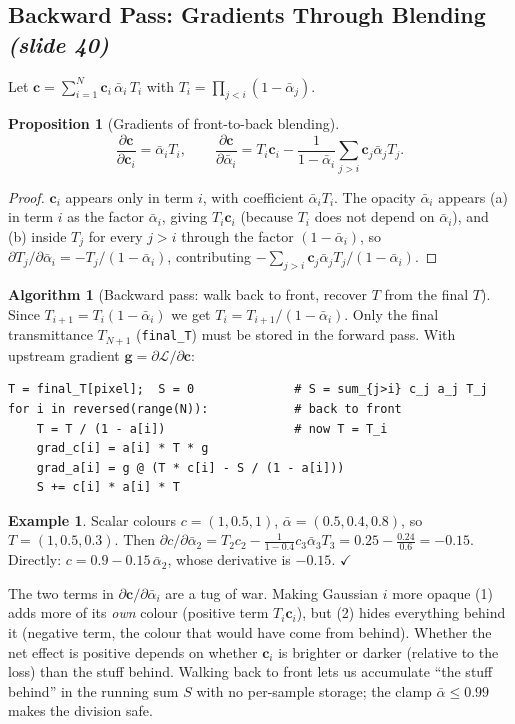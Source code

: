 \documentclass[11pt,a4paper]{article}
\newcommand{\Lc}{\mathcal{L}}
\newcommand{\abar}{\bar\alpha}
\newcommand{\sr}[1]{\texorpdfstring{\emph{(#1)}}{(#1)}}
\theoremstyle{definition}
\newtheorem{example}[definition]{Example}
\theoremstyle{algstyle}
\newtheorem{algorithm}[definition]{Algorithm}
\theoremstyle{plain}
\newtheorem{proposition}[definition]{Proposition}
\theoremstyle{remark}
\begin{document}
\subsection{Backward Pass: Gradients Through Blending \sr{slide 40}}
Let $\bm c=\sum_{i=1}^N\bm c_i\,\abar_i\,T_i$ with $T_i=\prod_{j<i}(1-\abar_j)$.

\begin{proposition}[Gradients of front-to-back blending]\label{prop:bwd}
\[
\frac{\partial\bm c}{\partial\bm c_i}=\abar_iT_i,\qquad
\frac{\partial\bm c}{\partial\abar_i}=T_i\bm c_i-\frac{1}{1-\abar_i}\sum_{j>i}\bm c_j\abar_jT_j .
\]
\end{proposition}
\begin{proof}
$\bm c_i$ appears only in term $i$, with coefficient $\abar_iT_i$. The opacity $\abar_i$ appears (a) in term $i$ as the factor $\abar_i$, giving $T_i\bm c_i$ (because $T_i$ does not depend on $\abar_i$), and (b) inside $T_j$ for every $j>i$ through the factor $(1-\abar_i)$, so $\partial T_j/\partial\abar_i=-T_j/(1-\abar_i)$, contributing $-\sum_{j>i}\bm c_j\abar_jT_j/(1-\abar_i)$.
\end{proof}

\begin{algorithm}[Backward pass: walk back to front, recover $T$ from the final $T$]\label{alg:bwd}
Since $T_{i+1}=T_i(1-\abar_i)$ we get $T_i=T_{i+1}/(1-\abar_i)$. Only the final transmittance $T_{N+1}$ (\texttt{final\_T}) must be stored in the forward pass. With upstream gradient $\bm g=\partial\Lc/\partial\bm c$:
\begin{lstlisting}
T = final_T[pixel];  S = 0              # S = sum_{j>i} c_j a_j T_j
for i in reversed(range(N)):            # back to front
    T = T / (1 - a[i])                  # now T = T_i
    grad_c[i] = a[i] * T * g
    grad_a[i] = g @ (T * c[i] - S / (1 - a[i]))
    S += c[i] * a[i] * T
\end{lstlisting}
\end{algorithm}

\begin{example}
Scalar colours $c=(1,0.5,1)$, $\abar=(0.5,0.4,0.8)$, so $T=(1,0.5,0.3)$. Then $\partial c/\partial\abar_2=T_2c_2-\frac1{1-0.4}c_3\abar_3T_3=0.25-\frac{0.24}{0.6}=-0.15$. Directly: $c=0.9-0.15\,\abar_2$, whose derivative is $-0.15$. $\checkmark$
\end{example}

\begin{intuition}
The two terms in $\partial\bm c/\partial\abar_i$ are a tug of war. Making Gaussian $i$ more opaque (1) adds more of its \emph{own} colour (positive term $T_i\bm c_i$), but (2) hides everything behind it (negative term, the colour that would have come from behind). Whether the net effect is positive depends on whether $\bm c_i$ is brighter or darker (relative to the loss) than the stuff behind. Walking back to front lets us accumulate ``the stuff behind'' in the running sum $S$ with no per-sample storage; the clamp $\abar\le0.99$ makes the division safe.
\end{intuition}
\end{document}
